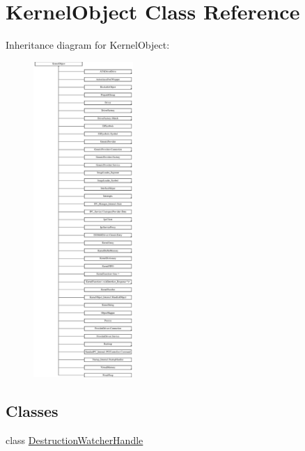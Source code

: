\hypertarget{class_kernel_object}{}\section{Kernel\+Object Class Reference}
\label{class_kernel_object}
Inheritance diagram for Kernel\+Object\+:\begin{figure}[H]
\begin{center}
\leavevmode
\includegraphics[height=12.000000cm]{class_kernel_object}
\end{center}
\end{figure}
\subsection*{Classes}
\begin{DoxyCompactItemize}
\item 
class \hyperlink{class_kernel_object_1_1_destruction_watcher_handle}{Destruction\+Watcher\+Handle}
\end{DoxyCompactItemize}
